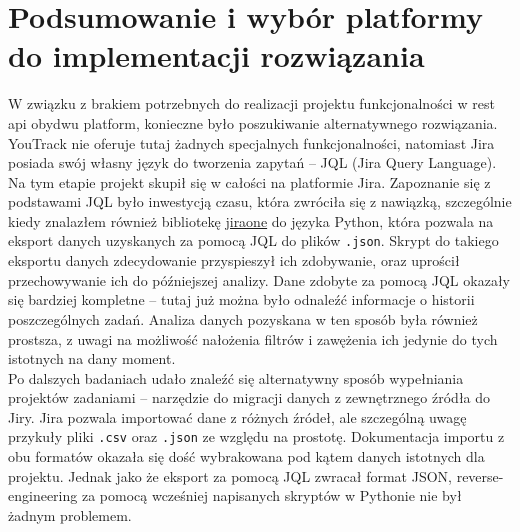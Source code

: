 \section*{Podsumowanie i wybór platformy do implementacji rozwiązania}
W związku z brakiem potrzebnych do realizacji projektu funkcjonalności w rest api obydwu platform, konieczne było poszukiwanie alternatywnego rozwiązania.
YouTrack nie oferuje tutaj żadnych specjalnych funkcjonalności, natomiast Jira posiada swój własny język do tworzenia zapytań -- JQL (Jira Query Language). \cite{YouTrackSearch} \cite{JiraJQL}
Na tym etapie projekt skupił się w całości na platformie Jira. Zapoznanie się z podstawami JQL było inwestycją czasu, która zwróciła się z nawiązką, szczególnie kiedy znalazłem również bibliotekę \href{https://pypi.org/project/jiraone/}{jiraone} do języka Python,
która pozwala na eksport danych uzyskanych za pomocą JQL do plików \texttt{.json}. Skrypt do takiego eksportu danych zdecydowanie przyspieszył ich zdobywanie, oraz uprościł przechowywanie ich do późniejszej analizy.
Dane zdobyte za pomocą JQL okazały się bardziej kompletne -- tutaj już można było odnaleźć informacje o historii poszczególnych zadań. Analiza danych pozyskana w ten sposób była również prostsza, z uwagi na możliwość nałożenia filtrów i zawężenia ich
jedynie do tych istotnych na dany moment.\\
Po dalszych badaniach udało znaleźć się alternatywny sposób wypełniania projektów zadaniami -- narzędzie do migracji danych z zewnętrznego źródła do Jiry. \cite{JiraImportExport}
Jira pozwala importować dane z różnych źródeł, ale szczególną uwagę przykuły pliki \texttt{.csv} oraz \texttt{.json} ze względu na prostotę.
Dokumentacja importu z obu formatów okazała się dość wybrakowana pod kątem danych istotnych dla projektu. Jednak jako że eksport za pomocą JQL zwracał format JSON, reverse-engineering za pomocą wcześniej napisanych skryptów w Pythonie nie był
żadnym problemem.
